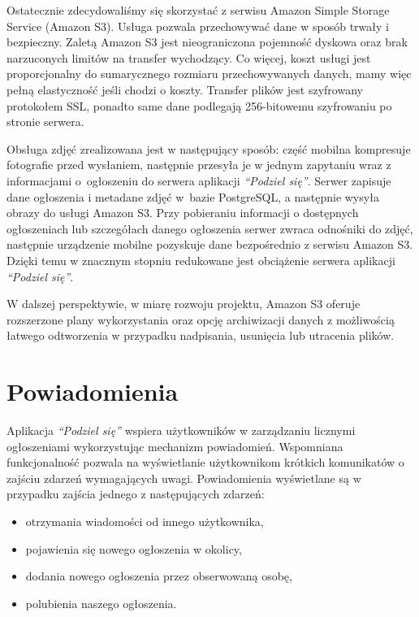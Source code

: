 \documentclass[licencjacka]{pracamgr}
\begin{document}
Ostatecznie zdecydowaliśmy się skorzystać z serwisu Amazon Simple Storage Service (Amazon S3). Usługa pozwala przechowywać dane w sposób trwały i bezpieczny. Zaletą Amazon S3 jest nieograniczona pojemność dyskowa oraz brak narzuconych limitów na transfer wychodzący. Co więcej, koszt usługi jest proporcjonalny do sumarycznego rozmiaru przechowywanych danych, mamy więc pełną elastyczność jeśli chodzi o koszty. Transfer plików jest szyfrowany protokołem SSL, ponadto same dane podlegają 256-bitowemu szyfrowaniu po stronie serwera.

Obsługa zdjęć zrealizowana jest w następujący sposób: część mobilna kompresuje fotografie przed wysłaniem, następnie przesyła je w jednym zapytaniu wraz z informacjami o~ogłoszeniu do serwera aplikacji \textit{``Podziel się''}. Serwer zapisuje dane ogłoszenia i metadane zdjęć w~bazie PostgreSQL, a następnie wysyła obrazy do usługi Amazon S3. Przy pobieraniu informacji o dostępnych ogłoszeniach lub szczegółach danego ogłoszenia serwer zwraca odnośniki do zdjęć, następnie urządzenie mobilne pozyskuje dane bezpośrednio z serwisu Amazon S3. Dzięki temu w znacznym stopniu redukowane jest obciążenie serwera aplikacji \textit{``Podziel się''}.

W dalszej perspektywie, w miarę rozwoju projektu, Amazon S3 oferuje rozszerzone plany wykorzystania oraz opcję archiwizacji danych z możliwością łatwego odtworzenia w przypadku nadpisania, usunięcia lub utracenia plików.

\section{Powiadomienia}

Aplikacja \textit{``Podziel się''} wspiera użytkowników w zarządzaniu licznymi ogłoszeniami wykorzystując mechanizm powiadomień. Wspomniana funkcjonalność pozwala na wyświetlanie użytkownikom krótkich komunikatów o zajściu zdarzeń wymagających uwagi.
Powiadomienia wyświetlane są w przypadku zajścia jednego z następujących zdarzeń:
\begin{itemize}
\setlength\itemsep{-0.2em}
    \item otrzymania wiadomości od innego użytkownika,
    \item pojawienia się nowego ogłoszenia w okolicy,
    \item dodania nowego ogłoszenia przez obserwowaną osobę,
    \item polubienia naszego ogłoszenia.
\end{itemize}{}
\end{document}
